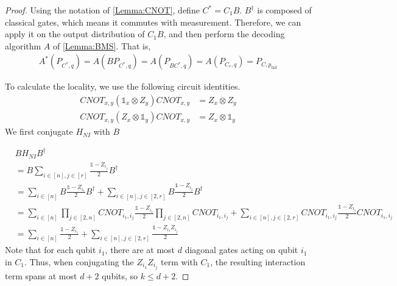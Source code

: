 \documentclass[a4paper,onecolumn,11pt,accepted=2017-05-09]{quantumarticle}
\newcommand{\ox}{\otimes}
\newcommand{\pfail}{p_{\text{fail}}}
\newcommand{\ident}{\mathds{1}}
\begin{document}
\begin{proof}
    Using the notation of \cref{Lemma:CNOT}, define $C^* = C_1 B$.  $B^\dagger$ is composed of classical gates, which means it commutes with measurement. Therefore, we can apply it on the output distribution of $C_1 B$, and then perform the decoding algorithm $A$ of \cref{Lemma:BMS}. That is,
    \begin{align}
        A^*(P_{C^*,q}) = A(B P_{C^*,q}) = A(P_{BC^*,q}) = A(P_{C_r,q}) = P_{C,\pfail}
    \end{align}

    To calculate the locality, we use the following circuit identities.
    \begin{align}
    CNOT_{x,y} (\ident_x \ox Z_y)CNOT_{x,y} &= Z_x\ox Z_y \\
    CNOT_{x,y} (Z_x\ox \ident_y)CNOT_{x,y} &= Z_x\ox \ident_y
\end{align}
We first conjugate $H_{NI}$ with $B$

    \begin{align*}
      &BH_{NI}B^\dagger \\
      &= B \sum_{i \in [n],j \in [r]} 
     \frac{\ident-Z_{i_j}}{2} B^\dagger\\
     &=  \sum_{i \in [n]}  B\frac{\ident-Z_{i_1}}{2}B^\dagger  + \sum_{i \in [n],j \in [2,r]} B\frac{\ident-Z_{i_j}}{2} B^\dagger  \\
      &=  \sum_{i \in [n]}\prod_{j \in [2,n]} CNOT_{i_1,i_j} \frac{\ident-Z_{i_1}}{2}\prod_{j \in [2,n]} CNOT_{i_1,i_j} + \sum_{i \in [n],j \in [2,r]} CNOT_{i_1,i_j} \frac{\ident-Z_{i_j}}{2}CNOT_{i_1,i_j}  \\
      &= \sum_{i \in [n]} \frac{\ident -Z_{i_1}}{2}+ \sum_{i \in [n],j \in [2,r]}  \frac{\ident -Z_{i_1} Z_{i_j}}{2}  
    \end{align*}
    Note that for each qubit $i_1$, there are at most $d$ diagonal gates acting on qubit $i_1$ in $C_{1}$. Thus, when conjugating the $Z_{i_1}Z_{i_j}$ term with $C_1$, the resulting interaction term spans at most $d+2$ qubits, so $k \leq d+2$. 


\end{proof}
\end{document}

